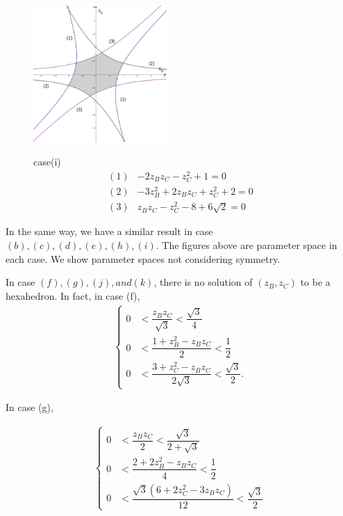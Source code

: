 \documentclass[suppldata, dvipdfmx]{interact}
\theoremstyle{plain}%
\theoremstyle{definition}
\theoremstyle{remark}
\theoremstyle{problemstyle}
\begin{document}
\begin{figure}[h!tbp]
 \begin{minipage}[]{0.5\textwidth}
 \centering
 \includegraphics[width=2in,
 keepaspectratio]{./img/graph/cubeI.png}
 \caption{}
 \label{fig:graphCubeI}
 \end{minipage}
 \hspace*{\fill}
 \begin{minipage}[]{0.5\textwidth}
  \centering
  case(i)
  \begin{align*}
   (1)& -2z_Bz_C - z_C^2 + 1 = 0\\
   (2)& -3z_B^2 + 2 z_B z_C + z_C^2 + 2 = 0\\
   (3)& z_Bz_C - z_C^2 - 8 + 6\sqrt{2} = 0
  \end{align*}
 \end{minipage}
 \hspace*{\fill}
\end{figure}

In the same way, we have a similar result in case 
$(b), (c), (d), (e), (h), (i)$. 
The figures above are parameter space in each case.
We show parameter spaces not considering symmetry.

In case $(f), (g), (j), and (k)$, there is no solution of $(z_B, z_C)$
to be a hexahedron. In fact, in case (f),
\begin{align*}
\begin{cases}
 0 &< \dfrac{z_Bz_C}{\sqrt{3}} < \dfrac{\sqrt{3}}{4} \\
 0 &< \dfrac{1 + z^2_B - z_Bz_C}{2} < \dfrac{1}{2} \\
 0 &< \dfrac{3 + z^2_C - z_Bz_C}{2\sqrt{3}} < \dfrac{\sqrt{3}}{2}.
\end{cases}
\end{align*}

In case (g),

\begin{align*}
\begin{cases}
0 &< \dfrac{z_Bz_C}{2} < \dfrac{\sqrt{3}}{2 + \sqrt{3}} \\
0 &< \dfrac{2 + 2z^2_B - z_Bz_C}{4} < \dfrac{1}{2} \\
0 &< \dfrac{\sqrt{3}(6 + 2z^2_C - 3z_Bz_C)}{12} < \dfrac{\sqrt{3}}{2}
\end{cases}
\end{align*}
\end{document}
